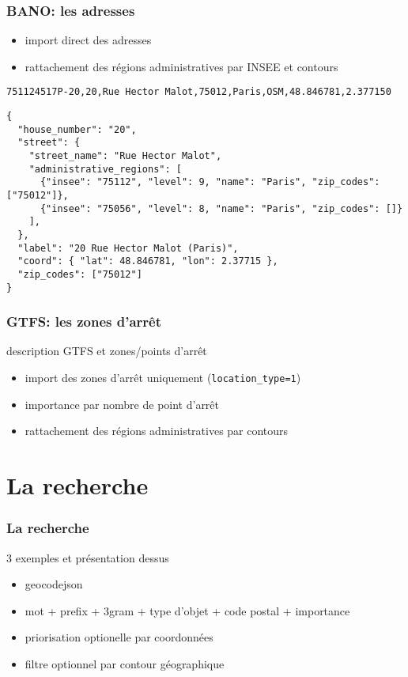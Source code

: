 \documentclass[table]{beamer}
\begin{document}
\begin{frame}[fragile]
  \frametitle{BANO: les adresses}

  \begin{itemize}
  \item import direct des adresses
  \item rattachement des régions administratives par INSEE et contours
  \end{itemize}

\scriptsize
\begin{verbatim}
751124517P-20,20,Rue Hector Malot,75012,Paris,OSM,48.846781,2.377150
\end{verbatim}

\begin{verbatim}
{
  "house_number": "20",
  "street": {
    "street_name": "Rue Hector Malot",
    "administrative_regions": [
      {"insee": "75112", "level": 9, "name": "Paris", "zip_codes": ["75012"]},
      {"insee": "75056", "level": 8, "name": "Paris", "zip_codes": []}
    ],
  },
  "label": "20 Rue Hector Malot (Paris)",
  "coord": { "lat": 48.846781, "lon": 2.37715 },
  "zip_codes": ["75012"]
}
\end{verbatim}
\end{frame}

\begin{frame}
  \frametitle{GTFS: les zones d'arrêt}

  description GTFS et zones/points d'arrêt

  \begin{itemize}
  \item import des zones d'arrêt uniquement (\texttt{location\_type=1})
  \item importance par nombre de point d'arrêt
  \item rattachement des régions administratives par contours
  \end{itemize}
\end{frame}

\section{La recherche}

\begin{frame}
  \frametitle{La recherche}

  3 exemples et présentation dessus

  \begin{itemize}
  \item geocodejson
  \item mot + prefix + 3gram + type d'objet + code postal + importance
  \item priorisation optionelle par coordonnées
  \item filtre optionnel par contour géographique
  \end{itemize}
\end{frame}
\end{document}

